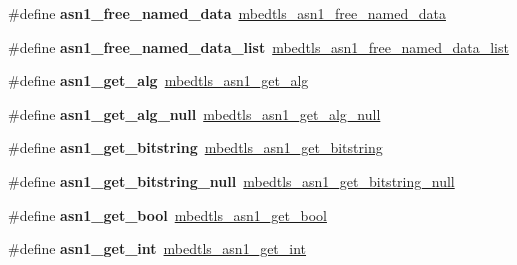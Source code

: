 \begin{DoxyCompactItemize}
\#define {\bfseries asn1\+\_\+free\+\_\+named\+\_\+data}~\mbox{\hyperlink{asn1_8h_a46abb857e148f22a616b56b66a781506}{mbedtls\+\_\+asn1\+\_\+free\+\_\+named\+\_\+data}}
\item 
\mbox{\label{compat-1_83_8h_a3c590b7c9c8a3d7d457bdaf7720377de}} 
\#define {\bfseries asn1\+\_\+free\+\_\+named\+\_\+data\+\_\+list}~\mbox{\hyperlink{asn1_8h_afd1a084a9285cebcd289bf6df0e6c021}{mbedtls\+\_\+asn1\+\_\+free\+\_\+named\+\_\+data\+\_\+list}}
\item 
\mbox{\label{compat-1_83_8h_a2f7bca82b24f7cd072cff05b86d8c114}} 
\#define {\bfseries asn1\+\_\+get\+\_\+alg}~\mbox{\hyperlink{asn1_8h_add253579640ea717f368d9a0f6085be0}{mbedtls\+\_\+asn1\+\_\+get\+\_\+alg}}
\item 
\mbox{\label{compat-1_83_8h_ab9df41f423cb1470d966dfc4c1894e72}} 
\#define {\bfseries asn1\+\_\+get\+\_\+alg\+\_\+null}~\mbox{\hyperlink{asn1_8h_adad023ecf92a50d47eaf206705efdb0e}{mbedtls\+\_\+asn1\+\_\+get\+\_\+alg\+\_\+null}}
\item 
\mbox{\label{compat-1_83_8h_a8feb228af8da65a9e159cb74eb8be01e}} 
\#define {\bfseries asn1\+\_\+get\+\_\+bitstring}~\mbox{\hyperlink{asn1_8h_ae2dcf021cf1326b62e2f23aa3bda69d0}{mbedtls\+\_\+asn1\+\_\+get\+\_\+bitstring}}
\item 
\mbox{\label{compat-1_83_8h_ab86dc74aa8e95f68bd12767e0f7df9d7}} 
\#define {\bfseries asn1\+\_\+get\+\_\+bitstring\+\_\+null}~\mbox{\hyperlink{asn1_8h_a0f9d2d846b16d5ce18ad99de6224313b}{mbedtls\+\_\+asn1\+\_\+get\+\_\+bitstring\+\_\+null}}
\item 
\mbox{\label{compat-1_83_8h_ae3b22fb36325de907d7af17e84372e04}} 
\#define {\bfseries asn1\+\_\+get\+\_\+bool}~\mbox{\hyperlink{asn1_8h_aec9e4bbd8690a8ab17cabf87893dbd2b}{mbedtls\+\_\+asn1\+\_\+get\+\_\+bool}}
\item 
\mbox{\label{compat-1_83_8h_ad3e839bb5f09993d6a1584ead6b2ecdd}} 
\#define {\bfseries asn1\+\_\+get\+\_\+int}~\mbox{\hyperlink{asn1_8h_a7f8a8b447c11f2200cc5aa8033801b72}{mbedtls\+\_\+asn1\+\_\+get\+\_\+int}}
\item 
\mbox{\label{compat-1_83_8h_a909f560c8c902a44560059afcb5e28f2}} 

\end{DoxyCompactItemize}

